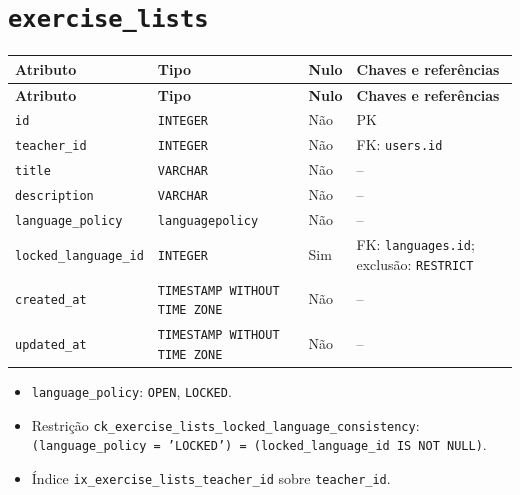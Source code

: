 \section*{\texttt{exercise\_\allowbreak{}lists}}
\begingroup\footnotesize
\setlength{\tabcolsep}{4pt}\renewcommand{\arraystretch}{1.15}
\begin{longtable}{|>{\raggedright\arraybackslash}p{}|>{\raggedright\arraybackslash}p{}|>{\raggedright\arraybackslash}p{}|>{\raggedright\arraybackslash}p{}|}
\hline
\textbf{Atributo} & \textbf{Tipo} & \textbf{Nulo} & \textbf{Chaves e referências} \\ \hline
\endfirsthead
\hline \textbf{Atributo} & \textbf{Tipo} & \textbf{Nulo} & \textbf{Chaves e referências} \\ \hline
\endhead
\texttt{id} & \texttt{INTEGER} & Não & PK \\ \hline
\texttt{teacher\_\allowbreak{}id} & \texttt{INTEGER} & Não & FK: \texttt{users.id} \\ \hline
\texttt{title} & \texttt{VARCHAR} & Não & -- \\ \hline
\texttt{description} & \texttt{VARCHAR} & Não & -- \\ \hline
\texttt{language\_\allowbreak{}policy} & \texttt{languagepolicy} & Não & -- \\ \hline
\texttt{locked\_\allowbreak{}language\_\allowbreak{}id} & \texttt{INTEGER} & Sim & FK: \texttt{languages.id}; exclusão: \texttt{RESTRICT} \\ \hline
\texttt{created\_\allowbreak{}at} & \texttt{TIMESTAMP WITHOUT TIME ZONE} & Não & -- \\ \hline
\texttt{updated\_\allowbreak{}at} & \texttt{TIMESTAMP WITHOUT TIME ZONE} & Não & -- \\ \hline
\end{longtable}
\begin{itemize}
\item \texttt{language\_\allowbreak{}policy}: \texttt{OPEN}, \texttt{LOCKED}.
\item Restrição \texttt{ck\_\allowbreak{}exercise\_\allowbreak{}lists\_\allowbreak{}locked\_\allowbreak{}language\_\allowbreak{}consistency}: \texttt{(language\_\allowbreak{}policy = 'LOCKED') = (locked\_\allowbreak{}language\_\allowbreak{}id IS NOT NULL)}.
\item Índice \texttt{ix\_\allowbreak{}exercise\_\allowbreak{}lists\_\allowbreak{}teacher\_\allowbreak{}id} sobre \texttt{teacher\_\allowbreak{}id}.
\end{itemize}
\endgroup

